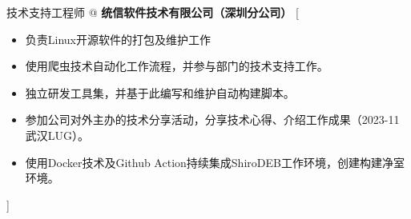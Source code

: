\documentclass[zh]{resume}
\begin{document}
\begin{experiences}
    {技术支持工程师 @ \textbf{统信软件技术有限公司（深圳分公司）}}%
    [\begin{itemize}
		\item 负责Linux开源软件的打包及维护工作
		\item 使用爬虫技术自动化工作流程，并参与部门的技术支持工作。
		\item 独立研发工具集，并基于此编写和维护自动构建脚本。
		\item 参加公司对外主办的技术分享活动，分享技术心得、介绍工作成果（2023-11 武汉LUG）。
		\item 使用Docker技术及Github Action持续集成ShiroDEB工作环境，创建构建净室环境。
    \end{itemize}]
\end{experiences}
\end{document}
